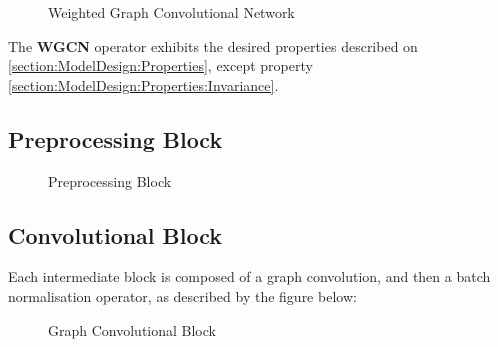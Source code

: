\begin{figure}[H]
	  \noindent
	
	\caption{Weighted Graph Convolutional Network}
	\label{fig:WGCN}
\end{figure}
\FloatBarrier
The \textbf{WGCN} operator exhibits the desired properties described on \ref{section:ModelDesign:Properties}, except property  \ref{section:ModelDesign:Properties:Invariance}.
\subsection{Preprocessing Block}
\begin{figure}[H]
	\noindent
	
	\caption{Preprocessing Block}
	\label{fig:PreprocessingBlock}
\end{figure}
\subsection{Convolutional Block}
Each intermediate block is composed of a graph convolution, and then a batch normalisation operator, as described by the figure below:
\begin{figure}[H]
	\noindent
	
	\caption{Graph Convolutional Block}
	\label{fig:ConvolutionalBlock}
\end{figure}
